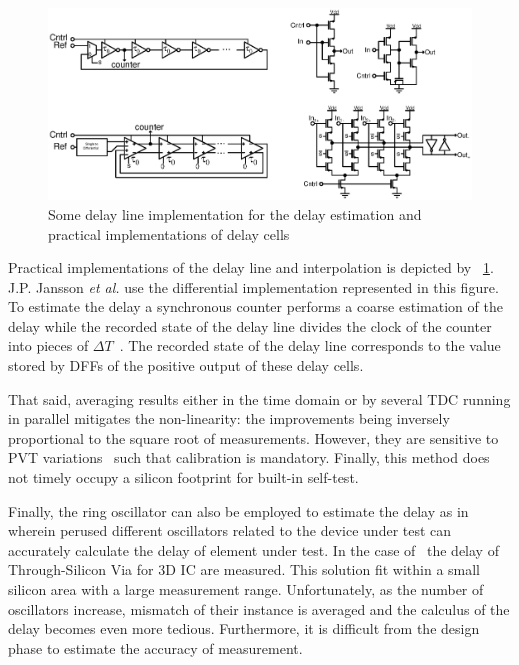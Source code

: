 \begin{figure}[htp]
    \centering
    \includegraphics[width=\textwidth]{Chapter5/Figs/delay_line_implementation_possible.ps}
    \caption{Some delay line implementation for the delay estimation and practical implementations of delay cells}
    \label{fig:delay_vernier_interpolation}
\end{figure}

Practical implementations of the delay line and interpolation is depicted by \figurename~\ref{fig:delay_vernier_interpolation}. J.P. Jansson \textit{et al.} use the differential implementation represented in this figure. To estimate the delay a synchronous counter performs a coarse estimation of the delay while the recorded state of the delay line divides the clock of the counter into pieces of \(\Delta T\)~\cite{1637593}. The recorded state of the delay line corresponds to the value stored by DFFs of the positive output of these delay cells.

That said, averaging results either in the time domain or by several TDC running in parallel mitigates the non-linearity: the improvements being inversely proportional to the square root of measurements. However, they are sensitive to PVT variations~\cite{6233014, 5256168} such that calibration is mandatory. Finally, this method does not timely occupy a silicon footprint for built-in self-test.

Finally, the ring oscillator can also be employed to estimate the delay as in~\cite{8267856} wherein perused different oscillators related to the device under test can accurately calculate the delay of element under test. In the case of~\cite{8267856} the delay of Through-Silicon Via for 3D IC are measured. This solution fit within a small silicon area with a large measurement range. Unfortunately, as the number of oscillators increase, mismatch of their instance is averaged and the calculus of the delay becomes even more tedious. Furthermore, it is difficult from the design phase to estimate the accuracy of measurement.

